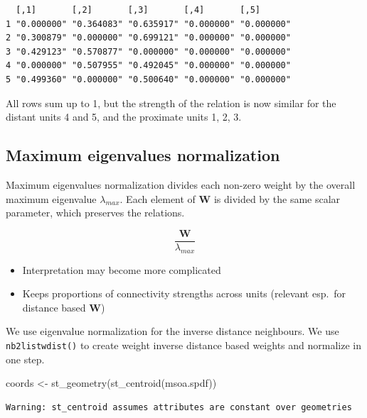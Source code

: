 \documentclass[
  letterpaper,
  DIV=11,
  numbers=noendperiod]{scrreprt}
\newenvironment{Shaded}{\begin{snugshade}}{\end{snugshade}}
\newcommand{\FunctionTok}[1]{\textcolor[rgb]{0.28,0.35,0.67}{#1}}
\newcommand{\NormalTok}[1]{\textcolor[rgb]{0.00,0.23,0.31}{#1}}
\newcommand{\OtherTok}[1]{\textcolor[rgb]{0.00,0.23,0.31}{#1}}
\begin{document}
\begin{verbatim}
  [,1]       [,2]       [,3]       [,4]       [,5]      
1 "0.000000" "0.364083" "0.635917" "0.000000" "0.000000"
2 "0.300879" "0.000000" "0.699121" "0.000000" "0.000000"
3 "0.429123" "0.570877" "0.000000" "0.000000" "0.000000"
4 "0.000000" "0.507955" "0.492045" "0.000000" "0.000000"
5 "0.499360" "0.000000" "0.500640" "0.000000" "0.000000"
\end{verbatim}

All rows sum up to 1, but the strength of the relation is now similar
for the distant units 4 and 5, and the proximate units 1, 2, 3.

\hypertarget{maximum-eigenvalues-normalization}{%
\subsection{Maximum eigenvalues
normalization}\label{maximum-eigenvalues-normalization}}

Maximum eigenvalues normalization divides each non-zero weight by the
overall maximum eigenvalue \(\lambda_{max}\). Each element of
\(\boldsymbol{\mathbf{W}}\) is divided by the same scalar parameter,
which preserves the relations.

\[
\frac{\boldsymbol{\mathbf{W}}}{\lambda_{max}}
\]

\begin{itemize}
\item
  Interpretation may become more complicated
\item
  Keeps proportions of connectivity strengths across units (relevant
  esp.~for distance based \(\boldsymbol{\mathbf{W}}\))
\end{itemize}

We use eigenvalue normalization for the inverse distance neighbours. We
use \texttt{nb2listwdist()} to create weight inverse distance based
weights and normalize in one step.

\begin{Shaded}
\begin{Highlighting}[]
\NormalTok{coords }\OtherTok{\textless{}{-}} \FunctionTok{st\_geometry}\NormalTok{(}\FunctionTok{st\_centroid}\NormalTok{(msoa.spdf))}
\end{Highlighting}
\end{Shaded}

\begin{verbatim}
Warning: st_centroid assumes attributes are constant over geometries
\end{verbatim}
\end{document}
